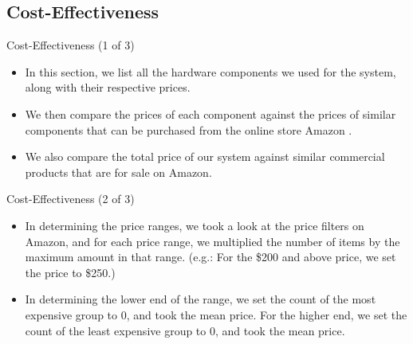 \subsection{Cost-Effectiveness}
\begin{frame}{Cost-Effectiveness (1 of 3)}
\begin{itemize}

    \item<1-> In this section, we list all the hardware components we used for the system, along with their respective prices.
    \item<2-> We then compare the prices of each component against the prices of similar components that can be purchased from the online store Amazon .
    \item<3-> We also compare the total price of our system against similar commercial products that are for sale on Amazon.
    
\end{itemize}
\end{frame}

\begin{frame}{Cost-Effectiveness (2 of 3)}
\begin{itemize}

    \item<1-> In determining the price ranges, we took a look at the price filters on Amazon, and for each price range, we multiplied the number of items by the maximum amount in that range. (e.g.: For the \$200 and above price, we set the price to \$250.)
    \item<2-> In determining the lower end of the range, we set the count of the most expensive group to 0, and took the mean price. For the higher end, we set the count of the least expensive group to 0, and took the mean price.
    
\end{itemize}
\end{frame}

